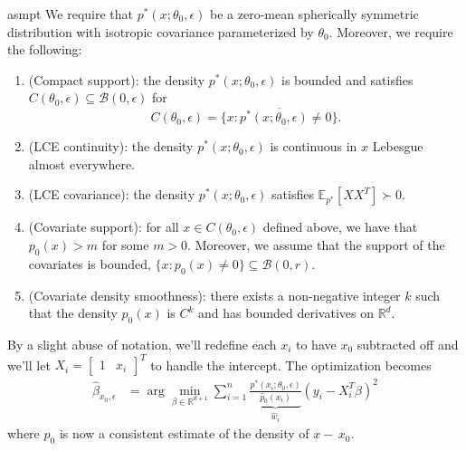 \documentclass[11pt]{article}
\begin{document}
\begin{restatable}{asmpt}{} \label{assumption: lce and covariate density}
    We require that $p^*(x; \theta_0, \epsilon)$ be a zero-mean spherically symmetric distribution with isotropic covariance parameterized by $\theta_0$. Moreover, we require the following: 
    \begin{enumerate}
        \item (Compact support): the density $p^*(x; \theta_0, \epsilon)$ is bounded and satisfies $C(\theta_0, \epsilon) \subseteq \mathcal{B}(0, \epsilon)$ for \begin{equation} \label{eq: support}
             C(\theta_0, \epsilon) = \overline{\{x : p^*(x; \theta_0, \epsilon) \neq 0\}}.
        \end{equation}
        \item (LCE continuity): the density $p^*(x; \theta_0, \epsilon)$ is continuous in $x$ Lebesgue almost everywhere.
        \item (LCE covariance): the density $p^*(x; \theta_0, \epsilon)$ satisfies $\mathbb{E}_{p^*}[XX^T] \succ 0$. 
        \item (Covariate support): for all $x \in C(\theta_0, \epsilon)$ defined above, we have that $p_0(x) > m$ for some $m > 0$. Moreover, we assume that the support of the covariates is bounded, $\{x : p_0(x) \neq 0\} \subseteq \mathcal{B}(0, r). $
        \item (Covariate density smoothness): 
        there exists a non-negative integer $k$ such that the density $p_0(x)$ is $C^k$ and has bounded derivatives on $\mathbb{R}^d$.
    \end{enumerate} 
\end{restatable}
\noindent By a slight abuse of notation, we'll redefine each $x_i$ to have $x_0$ subtracted off and we'll let $X_i = \begin{bmatrix}
    1 & x_i
\end{bmatrix}^T$ to handle the intercept. The optimization becomes 
\begin{align} 
\widehat{\beta}_{x_0,\epsilon} &= \arg\min_{\beta \in \mathbb{R}^{d+1}} \sum_{i = 1}^{n}\underbrace{\frac{p^*(x_i;\theta_0, \epsilon)}{\hat{p}_0(x_i)}}_{\hat{w}_i}\left(y_i - X_i^{T}\beta\right)^2
\end{align}
where $\hat{p}_0$ is now a consistent estimate of the density of $x - \,x_0$. 
\end{document}
